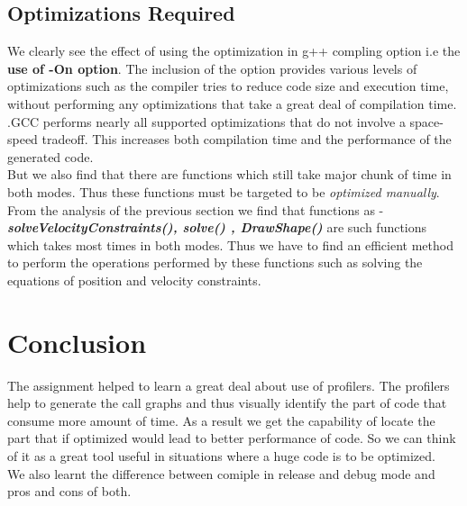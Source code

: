 \documentclass[11pt,]{article}
\begin{document}
\begin{singlespace}
\subsection{Optimizations Required}
We clearly see the effect of using the optimization in g++ compling option i.e the \textbf{use of -On option}. The inclusion of the option
provides various levels of optimizations such as the compiler tries to reduce code size and execution time, without performing any optimizations that take a great deal of compilation time. 
.GCC performs nearly all supported optimizations that do not involve a space-speed tradeoff. This increases both compilation time and the performance of the generated code.\\

But we also find that there are functions which still take major chunk of time in both modes. Thus these functions must be targeted to be \emph{optimized manually}.
From the analysis of the previous section we find that functions as - \textbf{\emph{solveVelocityConstraints(), solve() , DrawShape()}} are such functions 
which takes most times in both modes. Thus we have to find an efficient method to perform the operations performed by these functions such as 
solving the equations of position and velocity constraints.

\section{Conclusion}
The assignment helped to learn a great deal about use of profilers. The profilers help to generate the call graphs and thus visually identify the
part of code that consume more amount of time. As a result we get the capability of locate the part that if optimized would lead to better 
performance of code. So we can think of it as a great tool useful in situations where a huge code is to be optimized. \\

We also learnt the difference between comiple in release and debug mode and pros and cons of both.


\end{singlespace}
\end{document}
